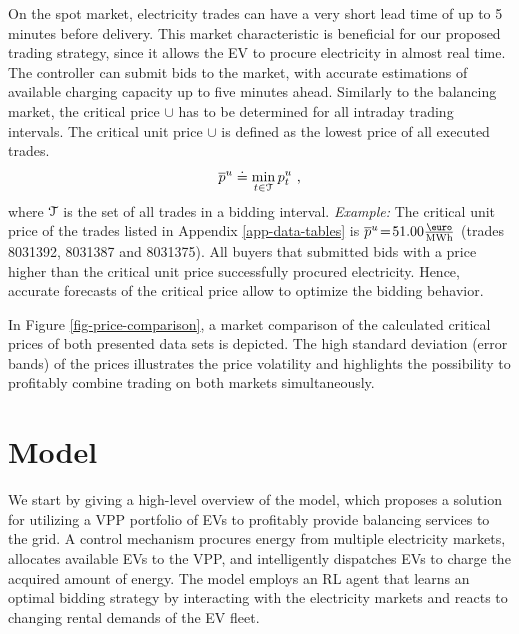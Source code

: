 \documentclass[a4paper, 12pt]{article}
\begin{document}
On the spot market, electricity trades can have a very short lead time of up to
5 minutes before delivery. This market characteristic is beneficial for our
proposed trading strategy, since it allows the EV to procure electricity in
almost real time. The controller can submit bids to the market, with accurate
estimations of available charging capacity up to five minutes ahead. Similarly
to the balancing market, the critical price \(\cup{}\) has to be determined for
all intraday trading intervals. The critical unit price \(\cup{}\) is defined as
the lowest price of all executed trades.
\begin{equation*}
    \overline p^u_{} \doteq \min_{t \in \cal{T}} p^u_{t} \text{ ,}
\end{equation*}
where \(\cal{T}\) is the set of all trades in a bidding interval. \emph{Example:} The
critical unit price of the trades listed in Appendix \ref{app-data-tables} is
\(\cup{} \!=\!51.00 \emwh\) (trades 8031392, 8031387 and 8031375). All buyers that
submitted bids with a price higher than the critical unit price successfully
procured electricity. Hence, accurate forecasts of the critical price allow to
optimize the bidding behavior.

In Figure \ref{fig-price-comparison}, a market comparison of the calculated
critical prices of both presented data sets is depicted. The high standard
deviation (error bands) of the prices illustrates the price volatility and
highlights the possibility to profitably combine trading on both markets
simultaneously.

\clearpage

\section{Model}
\label{sec:org354584c}
We start by giving a high-level overview of the model, which proposes a solution
for utilizing a VPP portfolio of EVs to profitably provide balancing services to
the grid. A control mechanism procures energy from multiple electricity markets,
allocates available EVs to the VPP, and intelligently dispatches EVs to charge
the acquired amount of energy. The model employs an RL agent that learns an
optimal bidding strategy by interacting with the electricity markets and reacts
to changing rental demands of the EV fleet.
\end{document}
